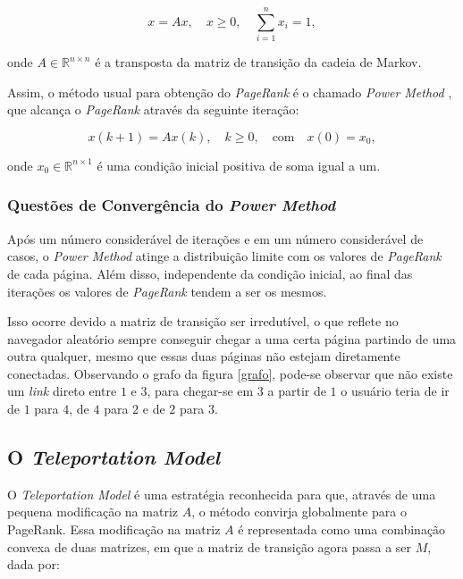 \documentclass[a4paper]{report} %
\begin{document}
\begin{equation}	
x = Ax, \quad x\geq0, \quad \sum^{n}_{i=1} x_{i} = 1, 
\end{equation}

\noindent onde $A \in \mathbb{R}^{n \times n}$ é a transposta da matriz de transição da cadeia de Markov.

Assim, o método usual para obtenção do \textit{PageRank} é o chamado \textit{Power Method} \cite{ishii2014pagerank}, que alcança o \textit{PageRank} através da seguinte iteração:

\begin{equation}
x(k+1) = Ax(k), \quad k\geq0, \quad \text{com} \quad x(0) = x_0,
\end{equation}

\noindent onde $x_0 \in \mathbb{R}^{n \times 1}$ é uma condição inicial positiva de soma igual a um.


\subsubsection*{Questões de Convergência do \textit{Power Method}}

Após um número considerável de iterações e em um número considerável de casos, o \textit{Power Method} atinge a distribuição limite com os valores de \textit{PageRank} de cada página. Além disso, independente da condição inicial, ao final das iterações os valores de \textit{PageRank} tendem a ser os mesmos.

Isso ocorre devido a matriz de transição ser irredutível, o que reflete no navegador aleatório sempre conseguir chegar a uma certa página partindo de uma outra qualquer, mesmo que essas duas páginas não estejam diretamente conectadas. Observando o grafo da figura \ref{grafo}, pode-se observar que não existe um \textit{link} direto entre $1$ e $3$, para chegar-se em $3$ a partir de $1$ o usuário teria de ir de $1$ para $4$, de $4$ para $2$ e de $2$ para $3$.


\subsection*{O \textit{Teleportation Model}}

O \textit{Teleportation Model} é uma estratégia reconhecida para que, através de uma pequena modificação na matriz $A$, o método convirja globalmente para o PageRank. Essa modificação na matriz $A$ é representada como uma combinação convexa de duas matrizes, em que a matriz de transição agora passa a ser $M$, dada por:
\end{document}
